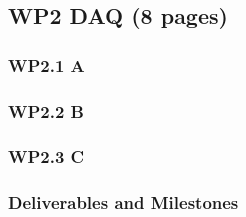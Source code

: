 \subsection{WP2 DAQ (8 pages)}


\subsubsection{WP2.1 A}
\subsubsection{WP2.2 B}
\subsubsection{WP2.3 C}

\subsubsection{Deliverables and Milestones}

